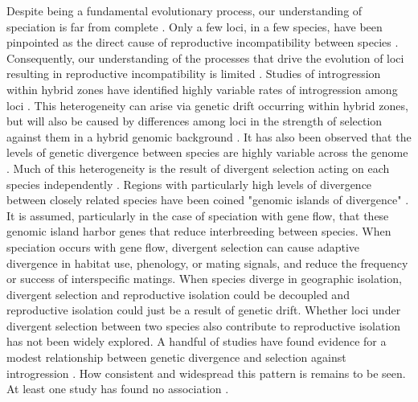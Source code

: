 Despite being a fundamental evolutionary process, our understanding of speciation 
is far from complete \parencite{butlin2011}. 
Only a few loci, in a few species, have been pinpointed as the direct cause of 
reproductive incompatibility between species \parencite{blackman2016,nosil2011}.
Consequently, our understanding of the processes that drive the evolution of loci
resulting in reproductive incompatibility is limited \parencite{butlin2011}. 
Studies of introgression within hybrid zones have identified highly variable
rates of introgression among loci \parencite{barton1985,gompert2017}.
This heterogeneity can arise via genetic drift occurring within hybrid zones,
but will also be caused by differences among loci in the strength of selection 
against them in a hybrid genomic background \parencite{barton1985,gompert2017}. 
It has also been observed that the levels of genetic divergence between species 
are highly variable across the genome \parencite{nosil2009}.
Much of this heterogeneity is the result of divergent selection acting on each 
species independently \parencite{nosil2009}.
Regions with particularly high levels of divergence between closely related species have been 
coined "genomic islands of divergence" \parencite{wolf2017}. 
It is assumed, particularly in the case of speciation with gene flow, that these
genomic island harbor genes that reduce interbreeding between species. 
When speciation occurs with gene flow, divergent selection can cause 
adaptive divergence in habitat use, phenology, or mating signals, and reduce the
frequency or success of interspecific matings. 
When species diverge in geographic isolation, divergent selection and reproductive
isolation could be decoupled and reproductive isolation could just be a result
of genetic drift.
Whether loci under divergent selection between two species also contribute to 
reproductive isolation has not been widely explored.
A handful of studies have found evidence for a modest relationship between 
genetic divergence and selection against introgression \parencite{nikolakis2022,gompert2012a,parchman2013,larson2013}.
How consistent and widespread this pattern is remains to be seen.
At least one study has found no association \parencite{jahner2021}.


